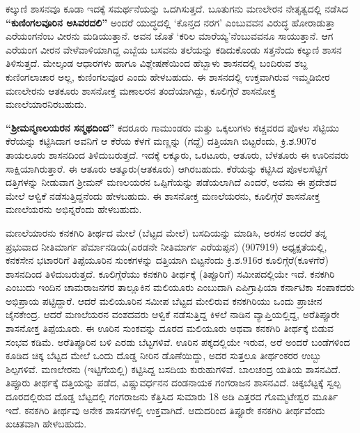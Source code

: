 ಕಲ್ಕುಣಿ ಶಾಸನವೂ ಕೂಡಾ ಇದಕ್ಕೆ ಸಮರ್ಥನೆಯನ್ನು ಒದಗಿಸುತ್ತದೆ. ಬೂತುಗನು ಮಣಲೇರನ ನೇತೃತ್ವದಲ್ಲಿ ನಡೆಸಿದ \textbf{“ಕುಣಿಂಗಲವೂರಿನ ಅಸಿವರದಲಿ”} ಅಂದರೆ ಯುದ್ಧದಲ್ಲಿ ‘ಕೊನ್ತದ ನರಗ’ ಎಂಬುವವನ ವಿರುದ್ಧ ಹೋರಾಡುತ್ತಾ ಎರೆಯಂಗನೆಂಬ ವೀರನು ಮಡಿಯುತ್ತಾನೆ. ಅವನ ಜೊತೆ ‘ಕರಿಲ ಮಾರೆಯ್ಯ’ನೆಂಬುವವನೂ ಸಾಯುತ್ತಾನೆ. ಆಗ ಎರೆಯಂಗ ವೀರನ ವೇಳೆವಾಳಿಯಾಗಿದ್ದ ಎಬ್ಬೆಯ ಬಸವನು ತಲೆಯನ್ನು ಕಡಿದುಕೊಂಡು ಸತ್ತನೆಂದು ಕಲ್ಕುಣಿ ಶಾಸನ ತಿಳಿಸುತ್ತದೆ. ಮೇಲ್ಕಂಡ ಆಧಾರಗಳು ಹಾಗೂ ವಿಶ್ಲೇಷಣೆಯಿಂದ ಹೆಬ್ಬಾಳು ಶಾಸನದಲ್ಲಿ ಬಂದಿರುವ ಶಬ್ದ ಕುಣಿಂಗಲಾಚಾರ ಅಲ್ಲ, ಕುಣಿಂಗಲವೂರ ಎಂದು ಹೇಳಬಹುದು. ಈ ಶಾಸನದಲ್ಲಿ ಉಕ್ತವಾಗಿರುವ ಇಮ್ಮಡಿಬೀರ ಮಣಲೇರನು ಆತಕೂರು ಶಾಸನೋಕ್ತ ಮಣಾಲರನ ತಂದೆಯಾಗಿದ್ದು, ಕೂಲಿಗ್ಗೆರೆ ಶಾಸನೋಕ್ತ ಮಣಲೆಯಾರನಿರಬಹುದು.

\textbf{“ಶ‍್ರೀಮನ್ಮಣಲಯರನ ಸನ್ಮಥದಿಂದ”} ಕದರೂರು ಗಾಮುಂಡರು ಮತ್ತು ಒಕ್ಕಲುಗಳು ಕಚ್ಚವರದ ಪೊಳಲ ಸೆಟ್ಟಿಯು ಕೆರೆಯನ್ನು ಕಟ್ಟಿಸಿದಾಗ ಅವನಿಗೆ ಆ ಕೆರೆಯ ಕೆಳಗೆ ಮಣ್ಣನ್ನು (ಗದ್ದೆ) ದತ್ತಿಯಾಗಿ ಬಿಟ್ಟರೆಂದು, ಕ್ರಿ.ಶ.907ರ ತಾಯಲೂರು ಶಾಸನದಿಂದ ತಿಳಿದುಬರುತ್ತದೆ. ಇದಕ್ಕೆ ಲಕ್ಕೂರು, ಒರಟೂರು, ಆತೂರು, ಬೆಳತೂರು ಈ ಊರಿನವರು ಸಾಕ್ಷಿಯಾಗಿರುತ್ತಾರೆ. ಈ ಆತೂರು ಆತ್ಕೂರು(ಆತಕೂರು) ಆಗಿರಬಹುದು. ಕೆರೆಯನ್ನು ಕಟ್ಟಿಸಿದ ಪೊಳಲಸೆಟ್ಟಿಗೆ ದತ್ತಿಗಳನ್ನು ನೀಡುವಾಗ ಶ‍್ರೀಮನ್​ ಮಣಲಯರನ ಒಪ್ಪಿಗೆಯನ್ನು ಪಡೆಯಲಾಗಿದೆ ಎಂದರೆ, ಅವನು ಈ ಪ್ರದೇಶದ ಮೇಲೆ ಆಳ್ವಿಕೆ ನಡೆಸುತ್ತಿದ್ದನೆಂದು ಹೇಳಬಹುದು. ಈ ಶಾಸನೋಕ್ತ ಮಣಲೆಯರನು, ಕೂಲಿಗ್ಗೆರೆ ಶಾಸನೋಕ್ತ ಮಣಲೆಯರನು ಅಭಿನ್ನರೆಂದು ಹೇಳಬಹುದು.

ಮಣಲೆಯಾರನು ಕನಕಗಿರಿ ತೀರ್ಥದ ಮೇಲೆ (ಬೆಟ್ಟದ ಮೇಲೆ) ಬಸದಿಯನ್ನು ಮಾಡಿಸಿ, ಅರಸನ ಅಂದರೆ ತನ್ನ ಪ್ರಭುವಾದ ನೀತಿಮಾರ್ಗ ಪೆರ್ಮಾನಡಿಯ(ಎರಡನೇ ನೀತಿಮಾರ್ಗ ಎರೆಯಪ್ಪನ) (907\enginline{-}919) ಅಧ್ಯಕ್ಷತೆಯಲ್ಲಿ, ಕನಕಸೇನ ಭಟಾರರಿಗೆ ತಿಪ್ಪೆಯೂರಿನ ಸುಂಕಗಳನ್ನು ದತ್ತಿಯಾಗಿ ಬಿಟ್ಟನೆಂದು ಕ್ರಿ.ಶ.916ರ ಕೂಲಿಗ್ಗೆರೆ(ಕೂಳಗೆರೆ) ಶಾಸನದಿಂದ ತಿಳಿದುಬರುತ್ತದೆ. ಕೂಲಿಗ್ಗೆರೆಯು ಕನಕಗಿರಿ ತೀರ್ಥಕ್ಕೆ (ತಿಪ್ಪೂರಿಗೆ) ಸಮೀಪದಲ್ಲಿಯೇ ಇದೆ. ಕನಕಗಿರಿ ಎಂಬುದು ಇಂದಿನ ಚಾಮರಾಜನಗರ ತಾಲ್ಲೂಕಿನ ಮಲಿಯೂರು ಎಂಬುದಾಗಿ ಎಪಿಗ್ರಾಫಿಯಾ ಕರ್ನಾಟಿಕಾ ಸಂಪಾಕದರು ಅಭಿಪ್ರಾಯ ಪಟ್ಟಿದ್ದಾರೆ. ಆದರೆ ಮಲಿಯೂರಿನ ಸಮೀಪ ಬೆಟ್ಟದ ಮೇಲಿರುವ ಕನಕಗಿರಿಯು ಒಂದು ಪ್ರಾಚೀನ ಜೈನಕೇಂದ್ರ. ಆದರೆ ಮಣಲೆಯರನ ವಂಶದವರು ಆಳ್ವಿಕೆ ನಡೆಸುತ್ತಿದ್ದ ಕಿಳಲೆ ನಾಡಿನ ವ್ಯಾಪ್ತಿಯಲ್ಲಿದ್ದ, ಅರೆತಿಪ್ಪೂರೇ ಶಾಸನೋಕ್ತ ತಿಪ್ಪೆಯೂರು. ಈ ಊರಿನ ಸುಂಕವನ್ನು ದೂರದ ಮಲಿಯೂರು ಅಥವಾ ಕನಕಗಿರಿ ತೀರ್ಥಕ್ಕೆ ಬಿಡುವ ಸಂಭವ ಕಡಿಮೆ. ಅರೆತಿಪ್ಪೂರಿನ ಬಳಿ ಎರಡು ಬೆಟ್ಟಗಳಿವೆ. ಊರಿನ ಪಕ್ಕದಲ್ಲಿಯೇ ಇರುವ, ಅರೆ ಅಂದರೆ ಬಂಡೆಗಳಿಂದ ಕೂಡಿದ ಚಿಕ್ಕ ಬೆಟ್ಟದ ಮೇಲೆ ಒಂದು ದೊಡ್ಡ ನೀರಿನ ಡೊಣೆಯಿದ್ದು, ಅದರ ಸುತ್ತಲೂ ತೀರ್ಥಂಕರರ ಉಬ್ಬು ಶಿಲ್ಪಗಳಿವೆ. ಮಣಲೇರನು (ಇಟ್ಟಿಗೆಯಲ್ಲಿ) ಕಟ್ಟಿಸಿದ್ದ ಬಸದಿಯ ಕುರುಹುಗಳಿವೆ. ಬಾಲಚಂದ್ರ ಯತಿಯ ಶಾಸನವಿದೆ. ತಿಪ್ಪೂರು ತೀರ್ಥಕ್ಕೆ ದತ್ತಿಯನ್ನು ಪಡೆದ, ವಿಷ್ಣುವರ್ಧನನ ದಂಡನಾಯಕ ಗಂಗರಾಜನ ಶಾಸನವಿದೆ. ಚಿಕ್ಕಬೆಟ್ಟಕ್ಕೆ ಸ್ವಲ್ಪ ದೂರದಲ್ಲಿರುವ ದೊಡ್ಡ ಬೆಟ್ಟದಲ್ಲಿ ಗಂಗರಾಜನು ಕೆತ್ತಿಸಿದ ಸುಮಾರು 18 ಅಡಿ ಎತ್ತರದ ಗೊಮ್ಮಟೇಶ್ವರ ಮೂರ್ತಿ ಇದೆ. ಕನಕಗಿರಿ ತೀರ್ಥವು ಅನೇಕ ಶಾಸನಗಳಲ್ಲಿ ಉಕ್ತವಾಗಿದೆ. ಆದುದರಿಂದ ತಿಪ್ಪೂರೇ ಕನಕಗಿರಿ ತೀರ್ಥವೆಂದು ಖಚಿತವಾಗಿ ಹೇಳಬಹುದು.

